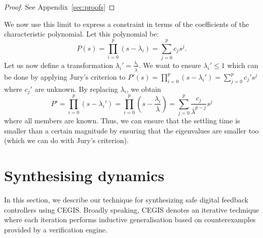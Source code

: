 \documentclass[sigconf]{llncs}
\begin{document}
\begin{proof}
See Appendix~\ref{sec:proofs}
\end{proof}
%
We now use this limit to express a constraint in terms of the
coefficients of the characteristic polynomial.  Let this
polynomial be:
%
\begin{equation}
P(s)=\prod_{i=0}^p (s-\lambda_i)=\sum_{j=0}^p c_js^j.
\end{equation}
%
Let us now define a
transformation $\lambda_i'=\frac{\lambda_i}{\overline{\lambda}}$.  We want
to ensure $\lambda_i' \leq 1$ which can be done by applying Jury's criterion
to $P'(s)=\prod_{i=0}^p (s-\lambda_i')=\sum_{j=0}^p c_j's^j$ where $c_j'$ are
unknown.  By replacing $\lambda_i$, we obtain
%
\begin{equation}
P'=\prod_{i=0}^p (s-\lambda_i')=\prod_{i=0}^p \left(s-\frac{\lambda_i}{\overline{\lambda}}\right)=\sum_{j=0}^p \frac{c_j}{\overline{\lambda}^{p-j}}s^j
\end{equation}
%
where all members are known. Thus, we can ensure that the settling time is smaller than
a certain magnitude by ensuring that 
the eigenvalues are smaller too (which we can do with Jury's criterion).

\section{Synthesising dynamics}\label{sec:dynamic_synth}

In this section, we describe our technique for synthesizing safe
digital feedback controllers using CEGIS. Broadly speaking, CEGIS
denotes an iterative technique where each iteration performs inductive
generalisation based on counterexamples provided by a verification
engine.
\end{document}
